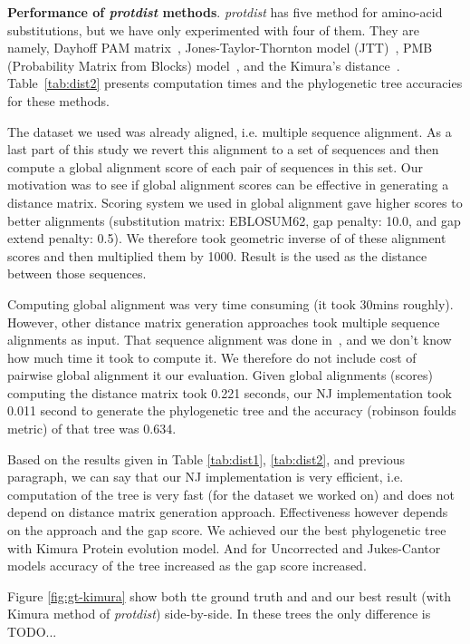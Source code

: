 \documentclass[11pt,letterpaper]{article}
\theoremstyle{definition}
\begin{document}
\textbf{Performance of \textit{protdist} methods}. \textit{protdist} has five method for amino-acid substitutions, but we have only experimented with four of them. They are namely, Dayhoff PAM matrix~\cite{kosiol2005different}, Jones-Taylor-Thornton model (JTT)~\cite{jones1992rapid}, PMB (Probability Matrix from Blocks) model~\cite{veerassamy2003transition}, and the Kimura's distance~\cite{kimura1983rare}. Table~\ref{tab:dist2} presents computation times and the phylogenetic tree accuracies for these methods.

The dataset we used was already aligned, i.e. multiple sequence alignment. As a last part of this study we revert this alignment to a set of sequences and then compute a global alignment score of each pair of sequences in this set. Our motivation was to see if global alignment scores can be effective in generating a distance matrix. Scoring system we used in global alignment gave higher scores to better alignments (substitution matrix: EBLOSUM62, gap penalty: 10.0, and gap extend penalty: 0.5). We therefore took geometric inverse of of these alignment scores and then multiplied them by 1000. Result is the used as the distance between those sequences.

Computing global alignment was very time consuming (it took 30mins roughly). However, other distance matrix generation approaches took multiple sequence alignments as input. That sequence alignment was done in~\cite{khafif2014identification}, and we don't know how much time it took to compute it. We therefore do not include cost of pairwise global alignment it our evaluation. Given global alignments (scores) computing the distance matrix took 0.221 seconds, our NJ implementation took 0.011 second to generate the phylogenetic tree and the accuracy (robinson foulds metric) of that tree was 0.634.

Based on the results given in Table \ref{tab:dist1}, \ref{tab:dist2}, and previous paragraph, we can say that our NJ implementation is very efficient, i.e. computation of the tree is very fast (for the dataset we worked on) and does not depend on distance matrix generation approach. Effectiveness however depends on the approach and the gap score. We achieved our the best phylogenetic tree with Kimura Protein evolution model. And for Uncorrected and Jukes-Cantor models accuracy of the tree increased as the gap score increased.

Figure \ref{fig:gt-kimura} show both tte ground truth and and our best result (with Kimura method of \textit{protdist}) side-by-side. In these trees the only difference is TODO...
\end{document}
